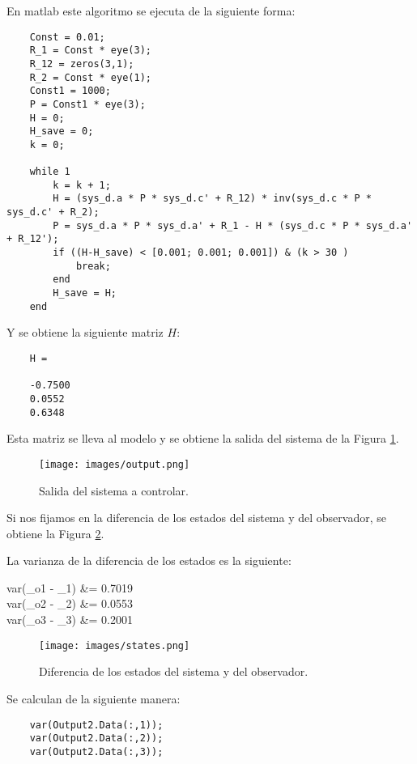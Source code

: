 \documentclass[a4paper, fontsize=11pt]{scrartcl} %
\numberwithin{equation}{section} %
\numberwithin{figure}{section} %
\numberwithin{table}{section} %
\newenvironment{myalign}{\par\nobreak\large\noindent\align}{\endalign} %
\begin{document}
	En matlab este algoritmo se ejecuta de la siguiente forma:
	
	\begin{lstlisting}
	Const = 0.01;
	R_1 = Const * eye(3);
	R_12 = zeros(3,1);
	R_2 = Const * eye(1);
	Const1 = 1000;
	P = Const1 * eye(3);
	H = 0;
	H_save = 0;
	k = 0;
	
	while 1
		k = k + 1;
		H = (sys_d.a * P * sys_d.c' + R_12) * inv(sys_d.c * P * sys_d.c' + R_2);
		P = sys_d.a * P * sys_d.a' + R_1 - H * (sys_d.c * P * sys_d.a' + R_12');
		if ((H-H_save) < [0.001; 0.001; 0.001]) & (k > 30 )
			break;
		end
		H_save = H;
	end
	\end{lstlisting} 
	Y se obtiene la siguiente matriz $H$:
	\begin{lstlisting}
	H =
	
	-0.7500
	0.0552
	0.6348
	\end{lstlisting}
	
	Esta matriz se lleva al modelo y se obtiene la salida del sistema de la Figura \ref{Output}.
	
	\begin{figure}[h!]
		\centering
		\texttt{[image: images/output.png]}
		\caption{Salida del sistema a controlar.}
		\label{Output}
	\end{figure}
	\FloatBarrier
	
	Si nos fijamos en la diferencia de los estados del sistema y del observador, se obtiene la Figura \ref{States}.
	
	La varianza de la diferencia de los estados es la siguiente:
	
	\begin{myalign}
		\begin{split}
			var(\dot{x}_{o1} - _1) &= 0.7019\\
			var(\dot{x}_{o2} - _2) &= 0.0553\\
			var(\dot{x}_{o3} - _3) &= 0.2001
		\end{split}
	\end{myalign}
	
	\begin{figure}[h!]
		\centering
		\texttt{[image: images/states.png]}
		\caption{Diferencia de los estados del sistema y del observador.}
		\label{States}
	\end{figure}
	\FloatBarrier
	
	Se calculan de la siguiente manera:
	
	\begin{lstlisting}
	var(Output2.Data(:,1));
	var(Output2.Data(:,2));
	var(Output2.Data(:,3));
	\end{lstlisting}
	
	
	
\end{document}
